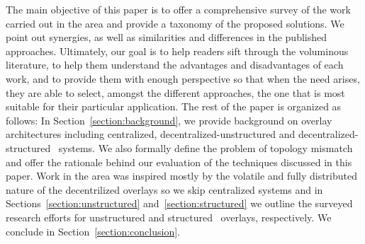 The main objective of this paper is to offer a comprehensive 
survey of the work carried out in the area
and provide a
taxonomy of the proposed solutions. We point out synergies, as well as
similarities and differences in the published approaches. 
Ultimately, our goal is to help readers sift through 
the voluminous literature, to help them
understand the advantages and disadvantages of each work, and 
to provide them with enough perspective so that 
when the need arises, they are able to
select, amongst the different approaches, the one that is most suitable for
their particular application.
The rest of the paper is organized as follows: 
In Section~\ref{section:background}, we provide background on
overlay architectures including centralized, decentralized-unstructured and
decentralized-structured \p\ systems.
We also formally define the problem of topology mismatch 
and offer the rationale behind our 
evaluation of the techniques discussed in this paper. 
Work in the area was inspired mostly by the volatile and fully
distributed nature of the decentrilized overlays so we skip
centralized systems and in Sections~\ref{section:unstructured} and~\ref{section:structured}
we outline the surveyed research efforts
for unstructured and structured \p\ overlays, respectively.
We conclude in Section~\ref{section:conclusion}.
